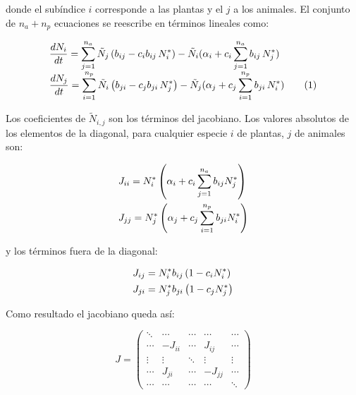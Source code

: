 \noindent donde el subíndice $i$ corresponde a las plantas y el $j$ a los animales. El conjunto de $n_{a} + n_{p}$ ecuaciones se reescribe en términos lineales como:

\begin{align}
\begin{array}{lcl}
\displaystyle \frac{dN_{i}}{dt} = \sum_{j=1}^{n_{a}} \tilde{N}_{j} \left(  b_{ij} - c_{i} b_{ij}\, N^{*}_i\right) - \tilde{N}_{i}(\alpha_{i}+ c_{i} \sum_{j=1}^{n_{a}} b_{ij} \, N^{*}_{j})\nonumber\\
\displaystyle \frac{dN_{j}}{dt} = \sum_{i=1}^{n_{p}} \tilde{N}_{i} \left( b_{ji} - c_{j} b_{ji}\, N^{*}_j\right) - \tilde{N}_{j}(\alpha_{j}+ c_{j} \sum_{i=1}^{n_{p}} b_{ji} \, N^{*}_{i})\stepcounter{equation}\tag{\theequation}\label{eq:effrateTaylor2N}
\end{array}
\end{align}

Los coeficientes de $\tilde{N}_{i,j}$ son los términos del jacobiano. Los valores absolutos de los elementos de la diagonal, para cualquier especie $i$ de plantas, $j$ de animales son:

\begin{align}
\displaystyle & J_{ii}=N^{*}_{i}\left(\alpha_{i} + c_{i} \sum_{j=1}^{n_{a}} b_{ij} N^{*}_{j}\right) \nonumber\\
\displaystyle & J_{jj}=N^{*}_{j}\left(\alpha_{j} + c_{j} \sum_{i=1}^{n_{p}} b_{ji} N^{*}_{i}\right)
\label{eq:Jii2}
\end{align}

\noindent y los términos fuera de la diagonal:

\begin{align}
\displaystyle & J_{ij}=N^{*}_{i}b_{ij}\left( 1-c_{i}N^{*}_{i}\right)\nonumber\\
\displaystyle & J_{ji}=N^{*}_{j}b_{ji}\left( 1-c_{j}N^{*}_{j}\right)
\label{eq:Jij}
\end{align}

\noindent Como resultado el jacobiano queda así:

\begin{equation*}
J=\left(
   \begin{array}{ccccc}
      \ddots  & \cdots & \cdots & \cdots & \cdots \\
      \cdots  & -J_{ii} & \cdots & J_{ij} & \cdots \\
      \vdots  & \vdots & \ddots  & \vdots & \vdots  \\
      \cdots  & J_{ji} & \cdots & -J_{jj} & \cdots \\
      \cdots  & \cdots & \cdots & \cdots  & \ddots
   \end{array}
\right)
\end{equation*}

